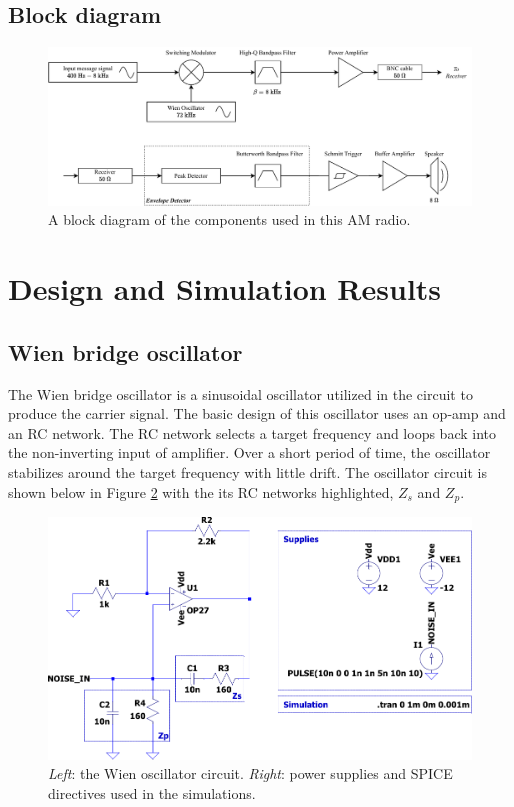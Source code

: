 \documentclass[11pt,letter,notitlepage]{article}
\begin{document}
	\begin{landscape}
		\subsection{Block diagram}
		\begin{figure}[h]
			\centering
			\includegraphics[width=\linewidth]{radiodiagram}
			\caption{A block diagram of the components used in this AM radio.}
			\label{fig:radiodiagram}
		\end{figure}
	\end{landscape}
	\clearpage %
	\section{Design and Simulation Results}
	\subsection{Wien bridge oscillator}
	The Wien bridge oscillator is a sinusoidal oscillator utilized in the circuit to produce the carrier signal. The basic design of this oscillator uses an op-amp and an RC network. The RC network selects a target frequency and loops back into the non-inverting input of amplifier. Over a short period of time, the oscillator stabilizes around the target frequency with little drift. The oscillator circuit is shown below in Figure \ref{fig:wienckt} with the its RC networks highlighted, $Z_s$ and $Z_p$.
	
	\begin{figure}[h]
		\centering
		\includegraphics[width=0.7\linewidth]{wien/wien_ckt-crop}
		\caption{\textit{Left}: the Wien oscillator circuit. \textit{Right}: power supplies and SPICE directives used in the simulations.}
		\label{fig:wienckt}
	\end{figure}
	
\end{document}
